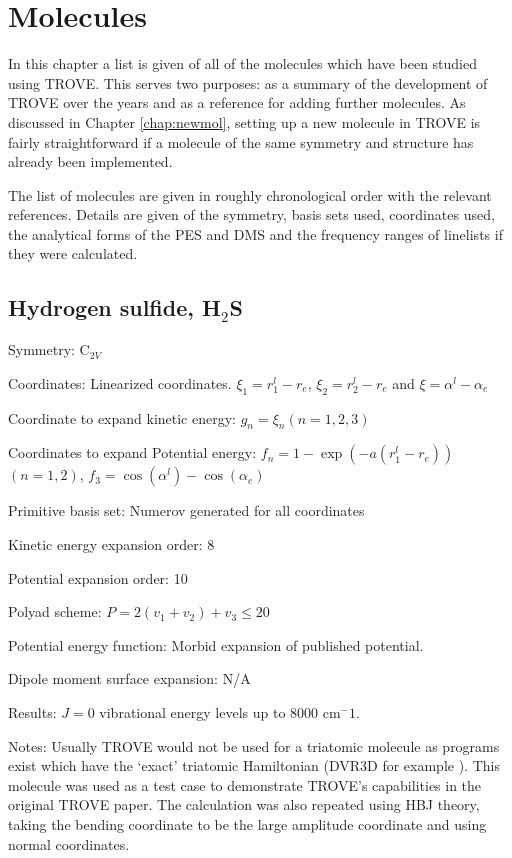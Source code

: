 
\chapter{Molecules}
\label{chap:molecules}

In this chapter a list is given of all of the molecules which have been studied using TROVE. 
This serves two purposes: as a
summary of the development of TROVE over the years and as a reference for adding further molecules. As discussed in Chapter 
\ref{chap:newmol}, setting up a new molecule in TROVE is fairly straightforward if a molecule of the same symmetry and 
structure has already been implemented. 

The list of molecules are given in roughly chronological order with the relevant references. Details are given of the 
symmetry, basis sets used, coordinates used, the analytical forms of the PES and DMS and the frequency ranges of 
linelists if they were calculated.



\section{Hydrogen sulfide, H$_2$S}

Symmetry: C$_{2V}$

Coordinates: Linearized coordinates. $\xi_1 = r_1^l - r_e$, $\xi_2 = r_2^l - r_e$ and $\xi = \alpha^l - \alpha_e$

Coordinate to expand kinetic energy: $g_n = \xi_n (n=1,2,3)$

Coordinates to expand Potential energy: $f_n = 1 - \exp(-a(r_1^l - r_e))$ $(n = 1, 2)$, $f_3 = \cos(\alpha^l) - \cos(\alpha_e)$

Primitive basis set: Numerov generated for all coordinates

Kinetic energy expansion order: 8

Potential expansion order: 10

Polyad scheme: $P = 2(v_1 + v_2) + v_3 \leq 20$

Potential energy function: Morbid expansion of published potential.

Dipole moment surface expansion: N/A

Results: $J = 0$ vibrational energy levels up to 8000 cm$^-1$. 

Notes: Usually TROVE would not be used for a triatomic molecule as programs exist which have the `exact' triatomic 
Hamiltonian (DVR3D for example \cite{DVR3D} ). This molecule was used as a test case to demonstrate TROVE's capabilities in the
original TROVE paper. The calculation was also repeated using HBJ theory, taking the bending coordinate to be the
large amplitude coordinate and using normal coordinates.


